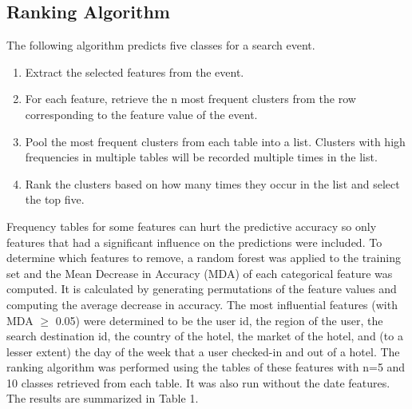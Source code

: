\documentclass[12pt]{report}
\begin{document}
\subsection{Ranking Algorithm}
The following algorithm predicts five classes for a search event.
\begin{enumerate}
  \item Extract the selected features from the event.
  \item For each feature, retrieve the n most frequent clusters from the row corresponding to the feature value of the event.
  \item Pool the most frequent clusters from each table into a list. Clusters with high frequencies in multiple tables will be recorded multiple times in the list.
  \item Rank the clusters based on how many times they occur in the list and select the top five.
\end{enumerate} 
Frequency tables for some features can hurt the predictive accuracy so only features that had a significant influence on the predictions were included. To determine which features to remove, a random forest was applied to the training set and the Mean Decrease in Accuracy (MDA) of each categorical feature was computed. It is calculated by generating permutations of the feature values and computing the average decrease in accuracy. The most influential features (with MDA $\geq$ 0.05) were determined to be the user id, the region of the user, the search destination id, the country of the hotel, the market of the hotel, and (to a lesser extent) the day of the week that a user checked-in and out of a hotel. The ranking algorithm was performed using the tables of these features with n=5 and 10 classes retrieved from each table. It was also run without the date features. The results are summarized in Table 1.
\end{document}
